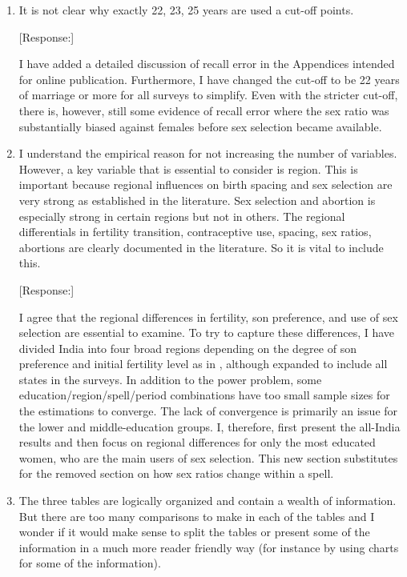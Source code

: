 \documentclass[letterpaper,12pt]{article}
\begin{document}
\begin{enumerate}
\item It is not clear why exactly 22, 23, 25 years are used a cut-off
points.

[Response:]

I have added a detailed discussion of recall error in the Appendices intended for online 
publication.
Furthermore, I have changed the cut-off to be 22 years of marriage or more for all surveys 
to simplify.
Even with the stricter cut-off, there is, however, still some evidence of recall error 
where the sex ratio was substantially biased against females  before sex selection became 
available.


\item I understand the empirical reason for not increasing the number of
variables. However, a key variable that is essential to consider is
region. This is important because regional influences on birth spacing
and sex selection are very strong as established in the literature. Sex
selection and abortion is especially strong in certain regions but not
in others. The regional differentials in fertility transition,
contraceptive use, spacing, sex ratios, abortions are clearly documented
in the literature. So it is vital to include this.

[Response:]

I agree that the regional differences in fertility, son preference, and use 
of sex selection are essential to examine.
To try to capture these differences, I have divided India into four broad regions 
depending on the degree of son preference and initial fertility level as in 
\citet{retherford03b}, although expanded to include all states in the surveys.
In addition to the power problem, some education/region/spell/period combinations have too 
small sample sizes for the estimations to converge.
The lack of convergence is primarily an issue for the lower and middle-education groups.
I, therefore, first present the all-India results and then focus on regional differences
for only the most educated women, who are the main users of sex selection.
This new section substitutes for the removed section on how sex ratios change within 
a spell.


\item The three tables are logically organized and contain a wealth of
information. But there are too many comparisons to make in each of the
tables and I wonder if it would make sense to split the tables or
present some of the information in a much more reader friendly way (for
instance by using charts for some of the information). 


\end{enumerate}
\end{document}
